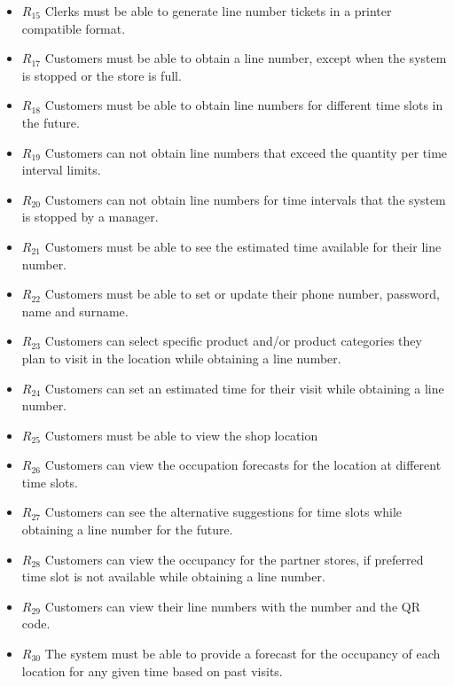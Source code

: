 \begin{itemize}
    \item \textbf{$R_{15}$} Clerks must be able to generate line number tickets in a printer compatible format.
    \item \textbf{$R_{17}$} Customers must be able to obtain a line number, except when the system is stopped or the store is full.
    \item \textbf{$R_{18}$} Customers must be able to obtain line numbers for different time slots in the future.
    \item \textbf{$R_{19}$} Customers can not obtain line numbers that exceed the quantity per time interval limits.
    \item \textbf{$R_{20}$} Customers can not obtain line numbers for time intervals that the system is stopped by a manager.
    \item \textbf{$R_{21}$} Customers must be able to see the estimated time available for their line number.
    \item \textbf{$R_{22}$} Customers must be able to set or update their phone number, password, name and surname. %
    \item \textbf{$R_{23}$} Customers can select specific product and/or product categories they plan to visit in the location while obtaining a line number.
    \item \textbf{$R_{24}$} Customers can set an estimated time for their visit while obtaining a line number.
    \item \textbf{$R_{25}$} Customers must be able to view the shop location
    \item \textbf{$R_{26}$} Customers can view the occupation forecasts for the location at different time slots.
    \item \textbf{$R_{27}$} Customers can see the alternative suggestions for time slots while obtaining a line number for the future.
    \item \textbf{$R_{28}$} Customers can view the occupancy for the partner stores, if preferred time slot is not available while obtaining a line number.
    \item \textbf{$R_{29}$} Customers can view their line numbers with the number and the QR code.
    \item \textbf{$R_{30}$} The system must be able to provide a forecast for the occupancy of each location for any given time based on past visits.
\end{itemize}

